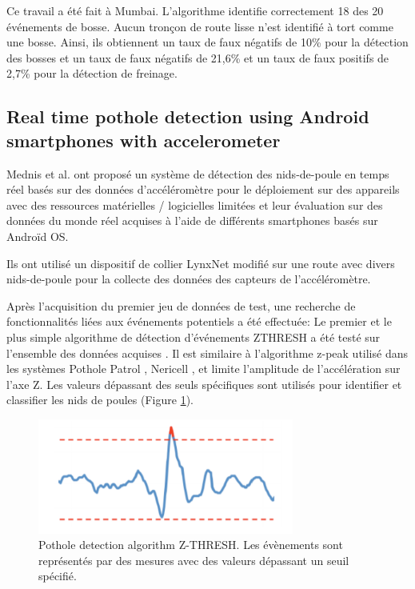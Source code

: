 Ce travail a été fait à Mumbai. L'algorithme identifie correctement 18 des 20 événements de bosse. Aucun tronçon de route lisse n'est identifié à tort comme une bosse. Ainsi, ils obtiennent un taux de faux négatifs de 10\% pour la détection des bosses et un taux de faux négatifs de 21,6\% et un taux de faux positifs de 2,7\% pour la détection de freinage.

\subsection{Real time pothole detection using Android smartphones with accelerometer}
Mednis et al. ont proposé un système de détection des nids-de-poule en temps réel basés sur des données d'accéléromètre pour le déploiement sur des appareils avec des ressources matérielles / logicielles limitées et leur évaluation sur des données du monde réel acquises à l'aide de différents smartphones basés sur Androïd OS.

Ils ont utilisé un dispositif de collier LynxNet modifié \cite{PDFLynxNetWild} sur une route avec divers nids-de-poule pour la collecte des données des capteurs de l'accéléromètre.

Après l'acquisition du premier jeu de données de test, une recherche de fonctionnalités liées aux événements potentiels a été effectuée: Le premier et le plus simple algorithme de détection d'événements ZTHRESH a été testé sur l'ensemble des données acquises . Il est similaire à l'algorithme z-peak utilisé dans les systèmes Pothole Patrol \cite{PotholePatrolProceedings}, Nericell \cite{mohanNericellUsingMobile2008}, et limite l'amplitude de l'accélération sur l'axe Z. Les valeurs dépassant des seuls spécifiques sont utilisés pour identifier et classifier les nids de poules (Figure \ref{fig:graph_Z_THRESH}). 

\begin{figure}[h!]
  \center
  \includegraphics[width=0.75\textwidth]{Images/chapter2/relatedWork3.PNG}
  \caption{Pothole detection algorithm Z-THRESH. Les évènements sont représentés par des mesures avec des valeurs dépassant un seuil spécifié.}
  \label{fig:graph_Z_THRESH}
\end{figure}

